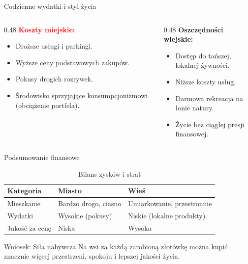 \begin{frame}{Codzienne wydatki i styl życia \cite{link5}}
    \begin{columns}
        \begin{column}{0.48\textwidth}
            \textbf{\textcolor{red}{Koszty miejskie:}}
            \begin{itemize}
                \item Droższe usługi i parkingi.
                \item Wyższe ceny podstawowych zakupów.
                \item Pokusy drogich rozrywek.
                \item Środowisko sprzyjające konsumpcjonizmowi (obciążenie portfela).
            \end{itemize}
        \end{column}
        
        \begin{column}{0.48\textwidth}
            \textbf{\textcolor{green!60!black}{Oszczędności wiejskie:}}
            \begin{itemize}
                \item Dostęp do tańszej, lokalnej żywności.
                \item Niższe koszty usług.
                \item Darmowa rekreacja na łonie natury.
                \item Życie bez ciągłej presji finansowej.
            \end{itemize}
        \end{column}
    \end{columns}
\end{frame}

\begin{frame}{Podsumowanie finansowe \cite{link5}}
    \begin{table}
        \centering
        \small
        \caption{Bilans zysków i strat}
        \begin{tabular}{|l|l|l|}
            \hline
            \textbf{Kategoria} & \textbf{Miasto} & \textbf{Wieś} \\ \hline
            Mieszkanie & Bardzo drogo, ciasno & Umiarkowanie, przestronnie \\ \hline
            Wydatki & Wysokie (pokusy) & Niskie (lokalne produkty) \\ \hline
            Jakość za cenę & Niska & Wysoka \\ \hline
        \end{tabular}
    \end{table}

    \vspace{0.5cm}

    \begin{block}{Wniosek: Siła nabywcza}
        Na wsi za każdą zarobioną złotówkę można kupić znacznie więcej przestrzeni, spokoju i lepszej jakości życia.
    \end{block}
\end{frame}

